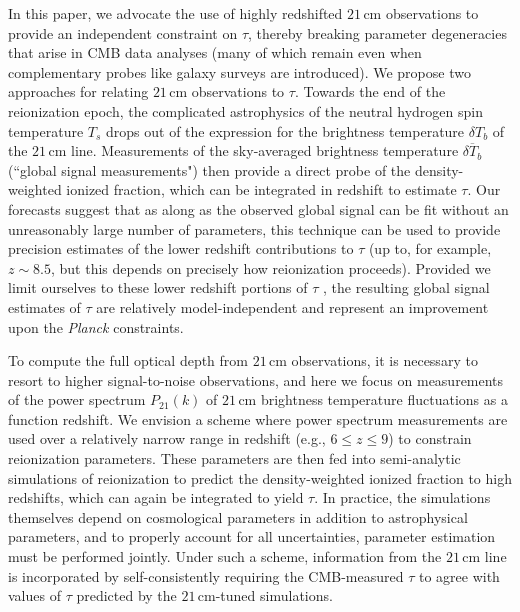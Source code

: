 \documentclass[twocolumn,aps,prd,nofootinbib,showpacs]{revtex4-1}
\begin{document}
In this paper, we advocate the use of highly redshifted $21\,\textrm{cm}$ observations to provide an independent constraint on $\tau$, thereby breaking parameter degeneracies that arise in CMB data analyses (many of which remain even when complementary probes like galaxy surveys are introduced). We propose two approaches for relating $21\,\textrm{cm}$ observations to $\tau$. Towards the end of the reionization epoch, the complicated astrophysics of the neutral hydrogen spin temperature $T_s$ drops out of the expression for the brightness temperature $\delta T_b$ of the $21\,\textrm{cm}$ line. Measurements of the sky-averaged brightness temperature $\overline{\delta T_b}$ (``global signal measurements") then provide a direct probe of the density-weighted ionized fraction, which can be integrated in redshift to estimate $\tau$. Our forecasts suggest that as along as the observed global signal can be fit without an unreasonably large number of parameters, this technique can be used to provide precision estimates of the lower redshift contributions to $\tau$ (up to, for example, $z \sim 8.5$, but this depends on precisely how reionization proceeds). Provided we limit ourselves to these lower redshift portions of $\tau$
, the resulting global signal estimates of $\tau$ are relatively model-independent and represent an improvement upon the \emph{Planck} constraints.

To compute the full optical depth from $21\,\textrm{cm}$ observations, it is necessary to resort to higher signal-to-noise observations, and here we focus on measurements of the power spectrum $P_{21} (k)$ of $21\,\textrm{cm}$ brightness temperature fluctuations as a function redshift. We envision a scheme where power spectrum measurements are used over a relatively narrow range in redshift (e.g., $6 \le z \le 9$) to constrain reionization parameters. These parameters are then fed into semi-analytic simulations of reionization to predict the density-weighted ionized fraction to high redshifts, which can again be integrated to yield $\tau$. In practice, the simulations themselves depend on cosmological parameters in addition to astrophysical parameters, and to properly account for all uncertainties, parameter estimation must be performed jointly. Under such a scheme, information from the $21\,\textrm{cm}$ line is incorporated by self-consistently requiring the CMB-measured $\tau$ to agree with values of $\tau$ predicted by the $21\,\textrm{cm}$-tuned simulations.
\end{document}
